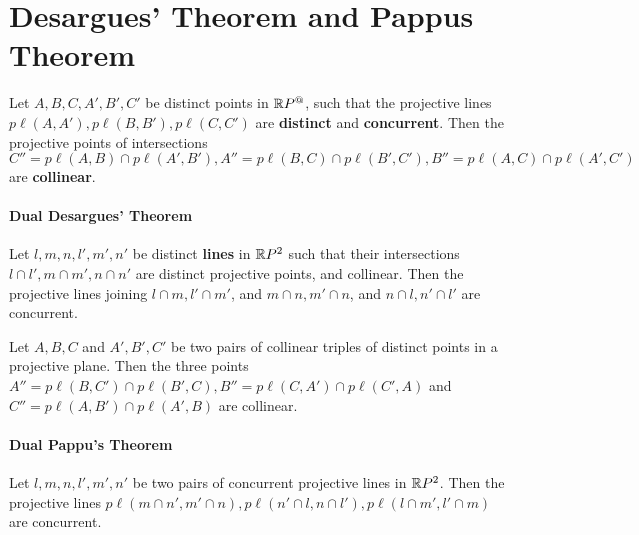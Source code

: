 \section{Desargues' Theorem and Pappus Theorem}
\begin{theorem}
    Let \(A, B, C, A', B', C'\) be distinct points in \(\mathbb{R} P^@\), such that the projective lines \(p\ell(A, A'), p\ell(B, B'), p\ell(C, C')\) are \textbf{distinct} and \textbf{concurrent}. Then the projective points of intersections \(C'' = p\ell(A, B) \cap p\ell(A', B'), A'' = p\ell(B, C) \cap p\ell(B', C'), B'' = p\ell(A, C) \cap p\ell(A', C')\) are \textbf{collinear}.
\end{theorem}

\paragraph{Dual Desargues' Theorem}
Let \(l, m, n, l', m', n'\) be distinct \textbf{lines} in \(\mathbb{R} P^2\) such that their intersections \(l \cap l', m \cap m', n \cap n'\) are distinct projective points, and collinear. Then the projective lines joining \(l \cap m, l' \cap m'\), and \(m \cap n, m' \cap n\), and \(n \cap l, n' \cap l'\) are concurrent.

\begin{theorem}
    Let \(A, B, C\) and \(A', B', C'\) be two pairs of collinear triples of distinct points in a projective plane. Then the three points \(A'' = p\ell(B, C') \cap p\ell(B', C), B'' = p\ell(C, A') \cap p\ell(C', A)\) and \(C'' = p\ell(A, B') \cap p\ell(A' ,B)\) are collinear.
\end{theorem}

\paragraph{Dual Pappu's Theorem}
Let \(l, m, n, l', m', n'\) be two pairs of concurrent projective lines in \(\mathbb{R} P^2\). Then the projective lines \(p\ell(m \cap n', m' \cap n), p\ell(n' \cap l, n \cap l'), p\ell(l \cap m', l' \cap m)\) are concurrent.